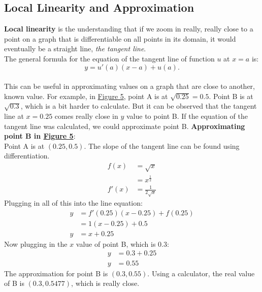 \documentclass[12pt]{article}
\begin{document}
        \subsection{Local Linearity and Approximation}
            \textbf{Local linearity} is the understanding that if we zoom in really, really close to a point on a graph that is differentiable on all points in its domain, it would eventually be a straight line, \textit{the tangent line}.
            \\ The general formula for the equation of the tangent line of function $u$ at $x=a$ is:
            \[ y=u'(a)(x-a) + u(a). \]
            \\ This can be useful in approximating values on a graph that are close to another, known value. For example, in \hyperref[fig:locallinapprox]{Figure 5}, point A is at $\sqrt{0.25} = 0.5$. Point B is at $\sqrt{0.3}$, which is a bit harder to calculate. But it can be observed that the tangent line at $x=0.25$ comes really close in $y$ value to point B. If the equation of the tangent line was calculated, we could approximate point B.
            \newline \newline
            \textbf{Approximating point B in \hyperref[fig:locallinapprox]{Figure 5}}:
            \\ Point A is at $(0.25, 0.5)$. The slope of the tangent line can be found using differentiation.
            \begin{align*}
                f(x) &= \sqrt{x} \\
                &= x^{\frac{1}{2}} \\
                f'(x) &= \frac{1}{2\sqrt{x}}
            \end{align*}
            Plugging in all of this into the line equation:
            \begin{align*}
                y &= f'(0.25)(x-0.25) + f(0.25) \\
                &= 1(x-0.25) + 0.5 \\
                y &= x+0.25
            \end{align*}
            Now plugging in the $x$ value of point B, which is $0.3$:
            \begin{align*}
                y &= 0.3 + 0.25 \\
                y &= 0.55
            \end{align*}
            The approximation for point B is $(0.3, 0.55)$. Using a calculator, the real value of B is $(0.3, 0.5477)$, which is really close.
\end{document}
